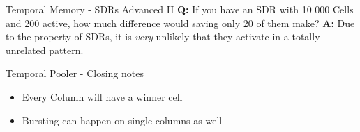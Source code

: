 \begin{frame}[c]{Temporal Memory - SDRs Advanced II}
    \Large
    \textbf{Q:} If you have an SDR with 10 000 Cells and 200 active, how much difference would saving only 20 of them make?
    \newline
    \pause
    \newline
    \textbf{A:} Due to the property of SDRs, it is {\em very} unlikely that they activate in a totally unrelated pattern.
\end{frame}














\begin{frame}[c]{Temporal Pooler - Closing notes}
    \begin{itemize}[<+(1)->]
        \item Every Column will have a winner cell
        \item Bursting can happen on single columns as well
    \end{itemize}
\end{frame}


